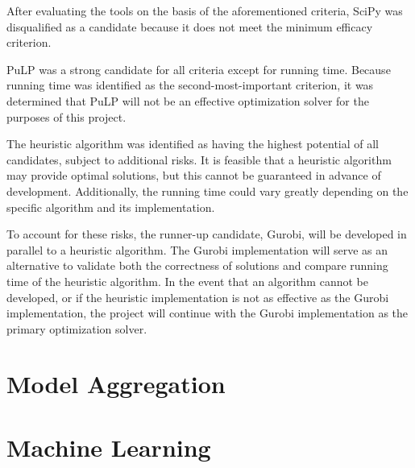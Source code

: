\documentclass[../mthe-493-final-project.tex]{subfiles}
\begin{document}
    After evaluating the tools on the basis of the aforementioned criteria, SciPy was disqualified as a candidate because it does not meet the minimum efficacy criterion.
    
    PuLP was a strong candidate for all criteria except for running time. Because running time was identified as the second-most-important criterion, it was determined that PuLP will not be an effective optimization solver for the purposes of this project.
    
    The heuristic algorithm was identified as having the highest potential of all candidates, subject to additional risks. It is feasible that a heuristic algorithm may provide optimal solutions, but this cannot be guaranteed in advance of development. Additionally, the running time could vary greatly depending on the specific algorithm and its implementation.
    
    To account for these risks, the runner-up candidate, Gurobi, will be developed in parallel to a heuristic algorithm. The Gurobi implementation will serve as an alternative to validate both the correctness of solutions and compare running time of the heuristic algorithm. In the event that an algorithm cannot be developed, or if the heuristic implementation is not as effective as the Gurobi implementation, the project will continue with the Gurobi implementation as the primary optimization solver.
    
    \section{Model Aggregation}
    \label{sec:model-aggregation-engineering-tools}
    
    \section{Machine Learning}
    \label{sec:machine-learning-engineering-tools}
    
    
\end{document}
